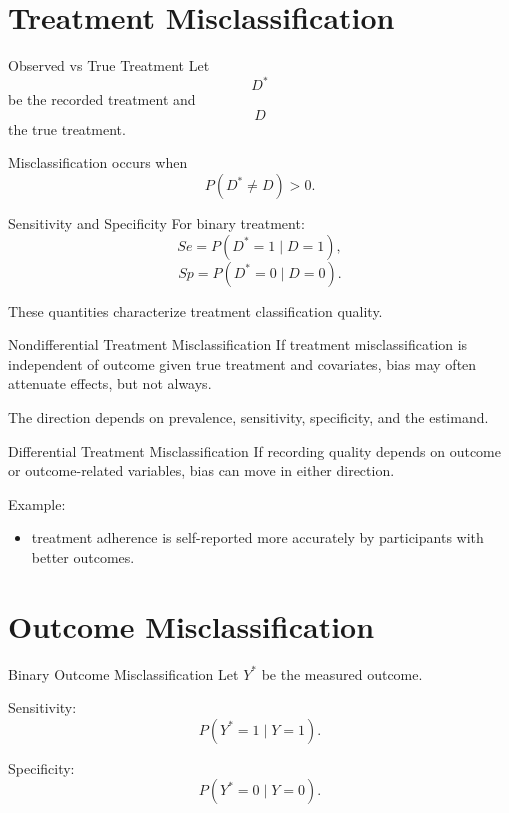 \documentclass[aspectratio=169,11pt]{beamer}
\begin{document}
\section{Treatment Misclassification}

\begin{frame}{Observed vs True Treatment}
Let
\[
D^\ast
\]
be the recorded treatment and
\[
D
\]
the true treatment.

Misclassification occurs when
\[
P(D^\ast\neq D)>0.
\]
\end{frame}

\begin{frame}{Sensitivity and Specificity}
For binary treatment:
\[
Se=P(D^\ast=1\mid D=1),
\]
\[
Sp=P(D^\ast=0\mid D=0).
\]

These quantities characterize treatment classification quality.
\end{frame}

\begin{frame}{Nondifferential Treatment Misclassification}
If treatment misclassification is independent of outcome given true treatment and covariates, bias may often attenuate effects, but not always.

The direction depends on prevalence, sensitivity, specificity, and the estimand.
\end{frame}

\begin{frame}{Differential Treatment Misclassification}
If recording quality depends on outcome or outcome-related variables, bias can move in either direction.

Example:
\begin{itemize}
\item treatment adherence is self-reported more accurately by participants with better outcomes.
\end{itemize}
\end{frame}

\section{Outcome Misclassification}

\begin{frame}{Binary Outcome Misclassification}
Let \(Y^\ast\) be the measured outcome.

Sensitivity:
\[
P(Y^\ast=1\mid Y=1).
\]

Specificity:
\[
P(Y^\ast=0\mid Y=0).
\]
\end{frame}
\end{document}
